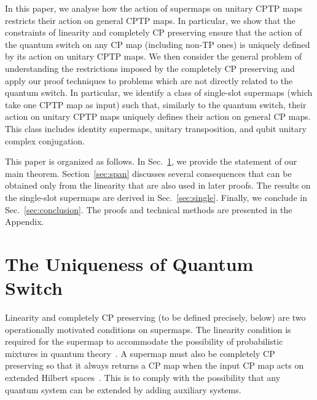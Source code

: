 \documentclass[a4paper,twocolumn,accepted=2022-10-23]{quantumarticle}
\theoremstyle{definition}
\begin{document}
In this paper, we analyse how the action of supermaps on unitary CPTP maps restricts their action on general CPTP maps. In particular, we show that the constraints of linearity and completely CP preserving ensure that the action of the quantum switch on any CP map (including non-TP ones) is uniquely defined by its action on unitary CPTP maps.  We then consider the general problem of understanding the restrictions imposed by the completely CP preserving and apply our proof techniques to problems which are not directly related to the quantum switch. In particular, we identify a class of single-slot supermaps (which take one CPTP map as input) such that, similarly to the quantum switch, their action on unitary CPTP maps uniquely defines their action on general CP maps. This class includes identity supermaps, unitary transposition, and qubit unitary complex conjugation.

This paper is organized as follows.
In Sec.~\ref{sec:qs}, we provide the statement of our main theorem.
Section~\ref{sec:span} discusses several consequences that can be obtained only from the linearity that are also used in later proofs.
The results on the single-slot supermaps are derived in Sec.~\ref{sec:single}.
Finally, we conclude in Sec.~\ref{sec:conclusion}. The proofs and technical methods are presented in the Appendix.

\section{The Uniqueness of Quantum Switch}\label{sec:qs}
Linearity and completely CP preserving (to be defined precisely, below) are two operationally motivated conditions on supermaps.
The linearity condition is required for the supermap to accommodate the possibility of probabilistic mixtures in quantum theory~\cite{barrett07}.
A supermap must also be completely CP preserving so that it always returns a CP map when the input CP map acts on extended Hilbert spaces~\cite{comb2,comb3}.  This is to comply with the possibility that any quantum system can be extended by adding auxiliary systems.
\end{document}
